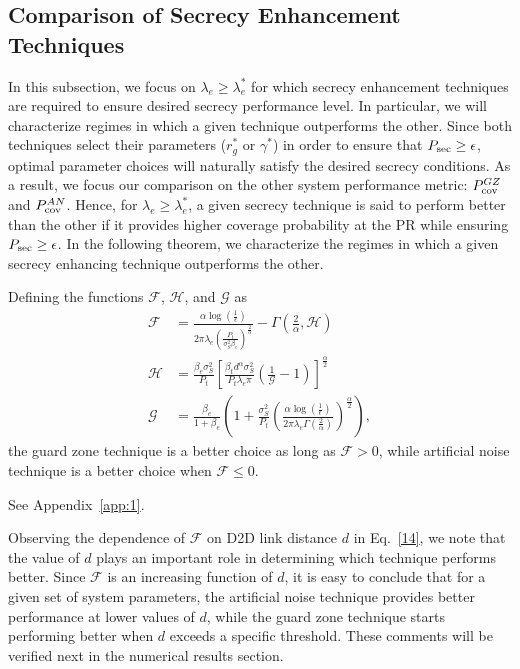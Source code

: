 \documentclass[final]{IEEEtran}
\begin{document}
\subsection{Comparison of Secrecy Enhancement Techniques}
In this subsection, we focus on $\lambda_e\geq\lambda_e^{*}$ for which secrecy enhancement techniques are required to ensure desired secrecy performance level. In particular, we will characterize regimes in which a given technique outperforms the other. Since both techniques select their parameters ($r_g^{*}$ or $\gamma^{*}$) in order to ensure that $P_{\rm sec}\geq\epsilon$, optimal parameter choices will naturally satisfy the desired secrecy conditions. As a result, we focus our comparison on the other system performance metric: $P_{\rm cov}^{GZ}$ and $P_{\rm cov}^{AN}$. Hence, for $\lambda_e\geq\lambda_e^{*}$, a given secrecy technique is said to perform better than the other if it provides higher coverage probability at the PR while ensuring $P_{\rm sec}\geq\epsilon$. 
In the following theorem, we characterize the regimes in which a given secrecy enhancing technique outperforms the other. 
\vspace{-2mm}
\begin{theorem} \label{thm:1}
Defining the functions $\mathcal{F}$, $\mathcal{H}$, and $\mathcal{G}$ as
\begin{align}
\label{14}
\mathcal{F}&=\frac{\alpha\log\left(\frac{1}{\epsilon}\right)}{2\pi\lambda_e\left(\frac{P_t}{\sigma_S^2\beta_e}\right)^{\frac{2}{\alpha}}}-\Gamma\left(\frac{2}{\alpha},\mathcal{H}\right)\\
\mathcal{H}&=\frac{\beta_e\sigma_S^2}{P_t}\left[\frac{\beta_t d^{\alpha}\sigma_S^2}{P_t\lambda_e\pi}\left(\frac{1}{\mathcal{G}}-1\right)\right]^{\frac{\alpha}{2}}\\
\mathcal{G}&=\frac{\beta_e}{1+\beta_e}\left(1+\frac{\sigma_S^2}{P_t}\left(\frac{\alpha \log\left(\frac{1}{\epsilon}\right)}{2\pi\lambda_e\Gamma(\frac{2}{\alpha})}\right)^{\frac{\alpha}{2}}\right),
\end{align}
the guard zone technique is a better choice as long as $\mathcal{F}> 0$, while artificial noise technique is a better choice when $\mathcal{F}\leq 0$.
\end{theorem}
\begin{IEEEproof}
See Appendix~\ref{app:1}.
\end{IEEEproof}
\begin{remark} \label{rem:d}
Observing the dependence of $\mathcal{F}$ on D2D link distance $d$ in Eq.~\ref{14}, we note that the value of $d$ plays an important role in determining which technique performs better. Since $\mathcal{F}$ is an increasing function of $d$, it is easy to conclude that for a given set of system parameters, the artificial noise technique provides better performance at lower values of $d$, while the guard zone technique starts performing better when $d$ exceeds a specific threshold. These comments will be verified next in the numerical results section.
\end{remark}
\vspace{-5mm}
\end{document}
